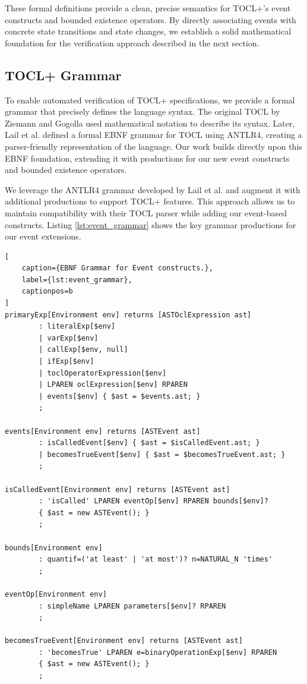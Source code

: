 These formal definitions provide a clean, precise semantics for TOCL+'s event constructs and bounded existence operators. By directly associating events with concrete state transitions and state changes, we establish a solid mathematical foundation for the verification approach described in the next section.



\subsection{TOCL+ Grammar}

\hspace{1cm} To enable automated verification of TOCL+ specifications, we provide a 
formal grammar that precisely defines the language syntax. The original TOCL by 
Ziemann and Gogolla used mathematical notation to describe its syntax. 
Later, Lail et al. \cite{TOCL2OCL} defined a formal EBNF grammar for TOCL using ANTLR4, 
creating a parser-friendly representation of the language. Our work builds directly 
upon this EBNF foundation, extending it with productions for our new event constructs 
and bounded existence operators.

We leverage the ANTLR4 grammar developed by Lail et al. and augment it with 
additional productions to support TOCL+ features. This approach allows us to 
maintain compatibility with their TOCL parser while adding our event-based 
constructs. Listing \ref{lst:event_grammar} shows the key grammar productions 
for our event extensions.

\begin{lstlisting}[
    caption={EBNF Grammar for Event constructs.}, 
    label={lst:event_grammar},
    captionpos=b
]
primaryExp[Environment env] returns [ASTOclExpression ast]
        : literalExp[$env]
        | varExp[$env]
        | callExp[$env, null]
        | ifExp[$env]
        | toclOperatorExpression[$env]
        | LPAREN oclExpression[$env] RPAREN
        | events[$env] { $ast = $events.ast; }
        ;

events[Environment env] returns [ASTEvent ast]
        : isCalledEvent[$env] { $ast = $isCalledEvent.ast; }
        | becomesTrueEvent[$env] { $ast = $becomesTrueEvent.ast; }
        ;

isCalledEvent[Environment env] returns [ASTEvent ast]
        : 'isCalled' LPAREN eventOp[$env] RPAREN bounds[$env]?
        { $ast = new ASTEvent(); }
        ;

bounds[Environment env]
        : quantif=('at least' | 'at most')? n=NATURAL_N 'times'
        ;

eventOp[Environment env]
        : simpleName LPAREN parameters[$env]? RPAREN
        ;

becomesTrueEvent[Environment env] returns [ASTEvent ast]
        : 'becomesTrue' LPAREN e=binaryOperationExp[$env] RPAREN
        { $ast = new ASTEvent(); }
        ;
\end{lstlisting}

